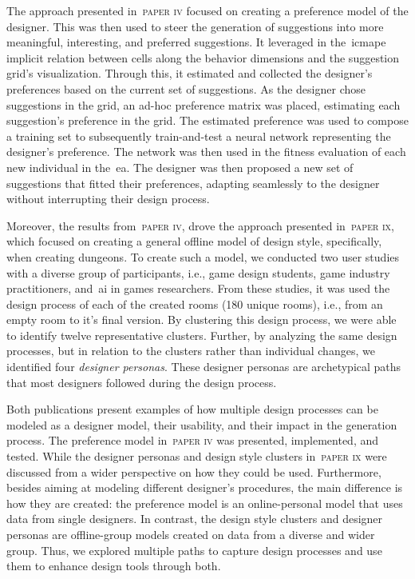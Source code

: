 The approach presented in~\textsc{paper iv} focused on creating a preference model of the designer. This was then used to steer the generation of suggestions into more meaningful, interesting, and preferred suggestions. It leveraged in the~\acrshort{icmape} implicit relation between cells along the behavior dimensions and the suggestion grid's visualization. Through this, it estimated and collected the designer's preferences based on the current set of suggestions. As the designer chose suggestions in the grid, an ad-hoc preference matrix was placed, estimating each suggestion's preference in the grid. The estimated preference was used to compose a training set to subsequently train-and-test a neural network representing the designer's preference. The network was then used in the fitness evaluation of each new individual in the~\acrshort{ea}. The designer was then proposed a new set of suggestions that fitted their preferences, adapting seamlessly to the designer without interrupting their design process.

Moreover, the results from~\textsc{paper iv}, drove the approach presented in~\textsc{paper ix}, which focused on creating a general offline model of design style, specifically, when creating dungeons. To create such a model, we conducted two user studies with a diverse group of participants, i.e., game design students, game industry practitioners, and~\acrshort{ai} in games researchers. From these studies, it was used the design process of each of the created rooms (180 unique rooms), i.e., from an empty room to it's final version. By clustering this design process, we were able to identify twelve representative clusters. Further, by analyzing the same design processes, but in relation to the clusters rather than individual changes, we identified four \emph{designer personas}. These designer personas are archetypical paths that most designers followed during the design process.


Both publications present examples of how multiple design processes can be modeled as a designer model, their usability, and their impact in the generation process. The preference model in~\textsc{paper iv} was presented, implemented, and tested. While the designer personas and design style clusters in~\textsc{paper ix} were discussed from a wider perspective on how they could be used. Furthermore, besides aiming at modeling different designer's procedures, the main difference is how they are created: the preference model is an online-personal model that uses data from single designers. In contrast, the design style clusters and designer personas are offline-group models created on data from a diverse and wider group. Thus, we explored multiple paths to capture design processes and use them to enhance design tools through both.

